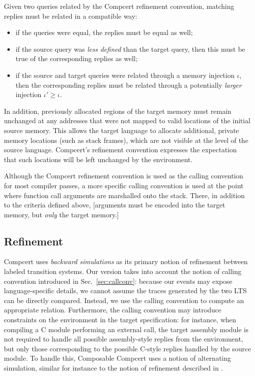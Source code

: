 \documentclass[acmsmall,10pt,review,anonymous]{acmart}
\begin{document}
Given two queries related by
the Compcert refinement convention,
matching replies
must be related in a compatible way:
\begin{itemize}
\item if the queries were equal,
  the replies must be equal as well;
\item if the source query was
  \emph{less defined} than the target query,
  then this must be true of the corresponding
  replies as well;
\item if the source and target queries
  were related through a memory injection $\iota$,
  then the corresponding replies
  must be related through a potentially \emph{larger}
  injection $\iota' \ge \iota$.
\end{itemize}
In addition,
previously allocated regions of the target memory
must remain unchanged
at any addresses that were not mapped to valid locations
of the initial source memory.
This allows the target language to allocate additional,
private memory locations (such as stack frames),
which are not visible at the level of the source language.
Compcert's refinement convention
expresses the expectation that such locations
will be left unchanged by the environment.

Although the Compcert refinement convention is used as
the calling convention for most compiler passes,
a more specific calling convention is used
at the point where function call arguments
are marshalled onto the stack.
There,
in addition to the criteria defined above,
[arguments must be encoded into the target memory,
but \emph{only} the target memory.]


\subsection{Refinement} %

Compcert uses \emph{backward simulations}
as its primary notion of refinement between labeled transition systems.
Our version takes into account the notion of calling convention
introduced in Sec.~\ref{sec:callconv}:
because our events may expose language-specific details,
we cannot assume the traces generated by the two LTS can be directly compared.
Instead,
we use the calling convention to compute an appropriate relation.
Furthermore,
the calling convention may introduce
constraints on the environment in the target specification:
for instance,
when compiling a C module performing an external call,
the target assembly module is not required to handle
all possible assembly-style replies from the environment,
but only those corresponding to the possible C-style replies
handled by the source module.
To handle this,
Composable Compcert uses a notion of alternating simulation,
similar for instance to the notion of refinement
described in \cite{gmos}.
\end{document}
